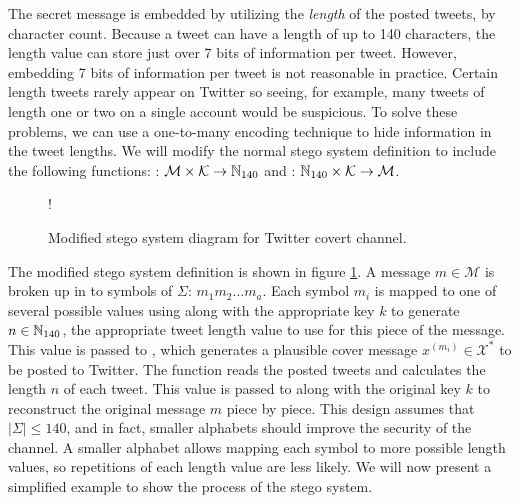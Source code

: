 The secret message is embedded by utilizing the \emph{length} of the posted
tweets, by character count.  Because a tweet can have a length of up to 140
characters, the length value can store just over 7 bits of information per
tweet.  However, embedding 7 bits of information per tweet is not reasonable in
practice.  Certain length tweets rarely appear on Twitter so seeing, for
example, many tweets of length one or two on a single account would be
suspicious.  To solve these problems, we can use a one-to-many encoding
technique to hide information in the tweet lengths.  We will modify
the normal stego system definition to include the following functions:
: $\mathcal{M} \times \mathcal{K} \rightarrow \mathbb{N}_{140}$ and :
$\mathbb{N}_{140} \times \mathcal{K} \rightarrow \mathcal{M}$.  

\begin{figure}
\centering
\resizebox {\columnwidth} {!} {
}
\caption{Modified stego system diagram for Twitter covert channel.}
\label{fig:stego-twittercc}
\end{figure}

The modified stego system definition is shown in figure
\ref{fig:stego-twittercc}.  A message $m \in \mathcal{M}$ is broken up in to
symbols of $\Sigma$: $m_1m_2\ldots m_a$.  Each symbol $m_i$ is mapped to one of
several possible values using  along with the appropriate key $k$ to generate $n
\in \mathbb{N}_{140}$, the appropriate tweet length value to use for this piece of the
message.  This value is passed to , which generates a plausible
cover message $x^{(m_i)} \in \mathcal{X^*}$ to be posted to Twitter.  The
 function reads the posted tweets and calculates the length $n$ of
each tweet.  This value is passed to  along with the original key
$k$ to reconstruct the original message $m$ piece by piece.  This design assumes
that $\lvert\Sigma\rvert \leq 140$, and in fact, smaller alphabets should
improve the security of the channel.  A smaller alphabet allows mapping each symbol to more
possible length values, so repetitions of each length value are less likely.  We
will now present a simplified example to show the process of the stego
system.

